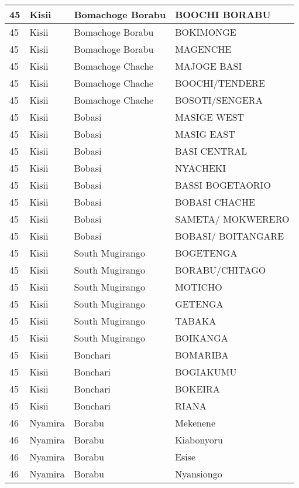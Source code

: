 \begin{table}[!ht]
\begin{tabular}{|l|l|l|l|}
        45 & Kisii & Bomachoge Borabu & BOOCHI BORABU \\ \hline
        45 & Kisii & Bomachoge Borabu & BOKIMONGE \\ \hline
        45 & Kisii & Bomachoge Borabu & MAGENCHE \\ \hline
        45 & Kisii & Bomachoge Chache & MAJOGE BASI \\ \hline
        45 & Kisii & Bomachoge Chache & BOOCHI/TENDERE \\ \hline
        45 & Kisii & Bomachoge Chache & BOSOTI/SENGERA \\ \hline
        45 & Kisii & Bobasi & MASIGE WEST \\ \hline
        45 & Kisii & Bobasi & MASIG EAST \\ \hline
        45 & Kisii & Bobasi & BASI CENTRAL \\ \hline
        45 & Kisii & Bobasi & NYACHEKI \\ \hline
        45 & Kisii & Bobasi & BASSI BOGETAORIO \\ \hline
        45 & Kisii & Bobasi & BOBASI CHACHE \\ \hline
        45 & Kisii & Bobasi & SAMETA/ MOKWERERO \\ \hline
        45 & Kisii & Bobasi & BOBASI/ BOITANGARE \\ \hline
        45 & Kisii & South Mugirango & BOGETENGA \\ \hline
        45 & Kisii & South Mugirango & BORABU/CHITAGO \\ \hline
        45 & Kisii & South Mugirango & MOTICHO \\ \hline
        45 & Kisii & South Mugirango & GETENGA \\ \hline
        45 & Kisii & South Mugirango & TABAKA \\ \hline
        45 & Kisii & South Mugirango & BOIKANGA \\ \hline
        45 & Kisii & Bonchari & BOMARIBA \\ \hline
        45 & Kisii & Bonchari & BOGIAKUMU \\ \hline
        45 & Kisii & Bonchari & BOKEIRA \\ \hline
        45 & Kisii & Bonchari & RIANA \\ \hline
        46 & Nyamira & Borabu & Mekenene \\ \hline
        46 & Nyamira & Borabu & Kiabonyoru \\ \hline
        46 & Nyamira & Borabu & Esise \\ \hline
        46 & Nyamira & Borabu & Nyansiongo \\ \hline

\end{tabular}
\end{table}
